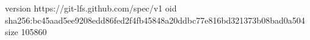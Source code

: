 version https://git-lfs.github.com/spec/v1
oid sha256:bc45aad5ee9208edd86fed2f4fb45848a20ddbc77e816bd321373b08bad0a504
size 105860
